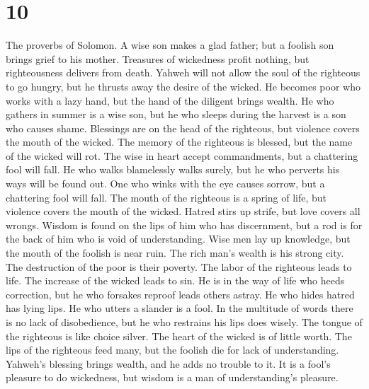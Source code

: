 \hypertarget{section-9}{%
\section{10}\label{section-9}}

 The proverbs of Solomon. A wise son makes a glad father;
but a foolish son brings grief to his mother.  Treasures
of wickedness profit nothing, but righteousness delivers from death.
 Yahweh will not allow the soul of the righteous to go
hungry, but he thrusts away the desire of the wicked.  He
becomes poor who works with a lazy hand, but the hand of the diligent
brings wealth.  He who gathers in summer is a wise son,
but he who sleeps during the harvest is a son who causes shame.
 Blessings are on the head of the righteous, but violence
covers the mouth of the wicked.  The memory of the
righteous is blessed, but the name of the wicked will rot.
 The wise in heart accept commandments, but a chattering
fool will fall.  He who walks blamelessly walks surely,
but he who perverts his ways will be found out.  One who
winks with the eye causes sorrow, but a chattering fool will fall.
 The mouth of the righteous is a spring of life, but
violence covers the mouth of the wicked.  Hatred stirs up
strife, but love covers all wrongs.  Wisdom is found on
the lips of him who has discernment, but a rod is for the back of him
who is void of understanding.  Wise men lay up knowledge,
but the mouth of the foolish is near ruin.  The rich
man's wealth is his strong city. The destruction of the poor is their
poverty.  The labor of the righteous leads to life. The
increase of the wicked leads to sin.  He is in the way of
life who heeds correction, but he who forsakes reproof leads others
astray.  He who hides hatred has lying lips. He who
utters a slander is a fool.  In the multitude of words
there is no lack of disobedience, but he who restrains his lips does
wisely.  The tongue of the righteous is like choice
silver. The heart of the wicked is of little worth.  The
lips of the righteous feed many, but the foolish die for lack of
understanding.  Yahweh's blessing brings wealth, and he
adds no trouble to it.  It is a fool's pleasure to do
wickedness, but wisdom is a man of understanding's pleasure.
